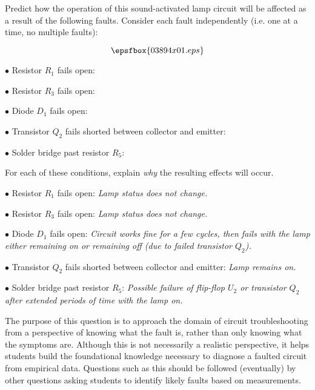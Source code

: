 

Predict how the operation of this sound-activated lamp circuit will be affected as a result of the following faults.  Consider each fault independently (i.e. one at a time, no multiple faults):

$$\epsfbox{03894x01.eps}$$

\medskip
\item{$\bullet$} Resistor $R_1$ fails open:
\vskip 5pt
\item{$\bullet$} Resistor $R_3$ fails open:
\vskip 5pt
\item{$\bullet$} Diode $D_1$ fails open:
\vskip 5pt
\item{$\bullet$} Transistor $Q_2$ fails shorted between collector and emitter:
\vskip 5pt
\item{$\bullet$} Solder bridge past resistor $R_5$:
\vskip 5pt
\medskip

For each of these conditions, explain {\it why} the resulting effects will occur.







\medskip
\item{$\bullet$} Resistor $R_1$ fails open: {\it Lamp status does not change.}
\vskip 5pt
\item{$\bullet$} Resistor $R_3$ fails open: {\it Lamp status does not change.}
\vskip 5pt
\item{$\bullet$} Diode $D_1$ fails open: {\it Circuit works fine for a few cycles, then fails with the lamp either remaining on or remaining off (due to failed transistor $Q_2$).}
\vskip 5pt
\item{$\bullet$} Transistor $Q_2$ fails shorted between collector and emitter: {\it Lamp remains on.}
\vskip 5pt
\item{$\bullet$} Solder bridge past resistor $R_5$: {\it Possible failure of flip-flop $U_2$ or transistor $Q_2$ after extended periods of time with the lamp on.}
\vskip 5pt
\medskip







The purpose of this question is to approach the domain of circuit troubleshooting from a perspective of knowing what the fault is, rather than only knowing what the symptoms are.  Although this is not necessarily a realistic perspective, it helps students build the foundational knowledge necessary to diagnose a faulted circuit from empirical data.  Questions such as this should be followed (eventually) by other questions asking students to identify likely faults based on measurements.





